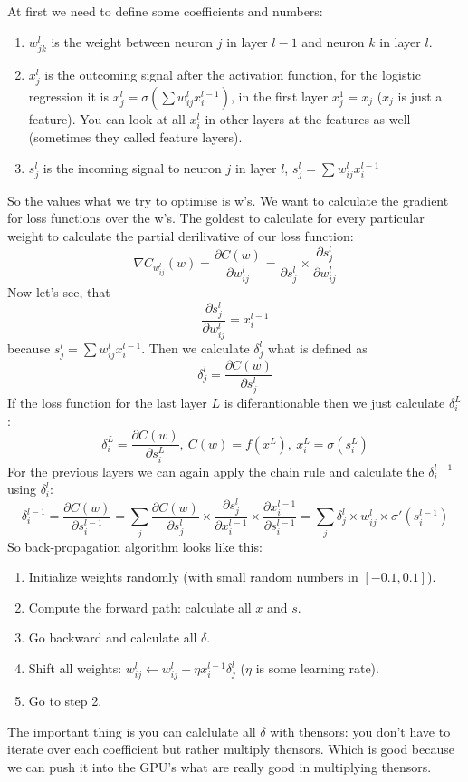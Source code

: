 At first we need to define some coefficients and numbers:
\begin{enumerate}[label=$\bullet$]
  \item $w_{jk}^l$ is the weight between neuron $j$ in layer $l-1$ and neuron $k$ in layer $l$.
  \item $x_j^l$ is the outcoming signal after the activation function, for the logistic regression it is $x_j^l=\sigma\left(\sum w_{ij}^lx_i^{l-1}\right)$, in the first layer $x_j^1=x_j$ ($x_j$ is just a feature). You can look at all $x_i^l$ in other layers at the features as well (sometimes they called feature layers).
  \item $s_j^l$ is the incoming signal to neuron $j$ in layer $l$, $s_j^l=\sum w_{ij}^lx_i^{l-1}$
\end{enumerate}
So the values what we try to optimise is w's. We want to calculate the gradient for loss functions over the w's. The goldest to calculate for every particular weight to calculate the partial derilivative of our loss function:
$$\nabla C_{w_{ij}^l}(w)=\frac{\partial C(w)}{\partial w_{ij}^l}=\frac{}{\partial s_j^l}\times\frac{\partial s_j^l}{\partial w_{ij}^l}$$
Now let's see, that
$$\frac{\partial s_j^l}{\partial w_{ij}^l}=x_i^{l-1}$$
because $s_j^l=\sum w_{ij}^lx_i^{l-1}$. Then we calculate $\delta_j^l$ what is defined as
$$\delta_j^l=\frac{\partial C(w)}{\partial s_j^l}$$
If the loss function for the last layer $L$ is diferantionable then we just calculate $\delta_i^L$:
$$\delta_i^L=\frac{\partial C(w)}{\partial s_i^L},\ C(w)=f(x^L),\ x_i^L=\sigma(s_i^L)$$
For the previous layers we can again apply the chain rule and calculate the $\delta_i^{l-1}$ using $\delta_i^l$:
$$\delta_i^{l-1}=\frac{\partial C(w)}{\partial s_i^{l-1}}=\sum\limits_{j}\frac{\partial C(w)}{\partial s_j^l}\times\frac{\partial s_j^l}{\partial x_i^{l-1}}\times\frac{\partial x_i^{l-1}}{\partial s_i^{l-1}}=\sum\limits_{j}\delta_j^l\times w_{ij}^l\times\sigma'(s_i^{l-1})$$
So back-propagation algorithm looks like this:
\begin{enumerate}[label=\arabic*.]
  \item Initialize weights randomly (with small random numbers in $[-0.1,0.1]$).
  \item Compute the forward path: calculate all $x$ and $s$.
  \item Go backward and calculate all $\delta$.
  \item Shift all weights: $w_{ij}^l\leftarrow w_{ij}^l-\eta x_i^{l-1}\delta_j^l$ ($\eta$ is some learning rate).
  \item Go to step 2.
\end{enumerate}
The important thing is you can calclulate all $\delta$ with thensors: you don't have to iterate over each coefficient but rather multiply thensors. Which is good because we can push it into the GPU's what are really good in multiplying thensors.

